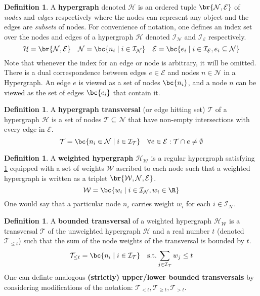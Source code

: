 \documentclass[aps, 10pt, english, twoside, pra, nofootinbib, longbibliography]{revtex4-1}
\theoremstyle{plain}
\theoremstyle{definition}
\newtheorem{definition}[theorem]{Definition}
\theoremstyle{remark}
\newcommand{\hgraph}{\mathcal{H}}
\newcommand{\nodes}{\mathcal{N}}
\newcommand{\weights}{\mathcal{W}}
\newcommand{\edges}{\mathcal{E}}
\newcommand{\trans}{\mathcal{T}}
\newcommand{\ind}{\mathcal{I}}
\newcommand{\term}[1]{\textcolor{Mahogany}{\textbf{#1}}}
\begin{document}
    \begin{definition}
        \label{def:hypergraph}
        A \term{hypergraph} denoted $\hgraph$ is an ordered tuple $\br{\nodes, \edges}$ of \textit{nodes} and \textit{edges} respectively where the nodes can represent any object and the edges are \textit{subsets} of nodes. For convenience of notation, one defines an index set over the nodes and edges of a hypergraph $\hgraph$ denoted $\ind_\nodes$ and $\ind_\edges$ respectively.
        \[ \hgraph = \br{\nodes, \edges} \quad \nodes = \bc{n_i \mid i \in \ind_\nodes} \quad \edges = \bc{e_i \mid i \in \ind_\edges, e_i \subseteq \nodes} \]
        Note that whenever the index for an edge or node is arbitrary, it will be omitted. There is a dual correspondence between edges $e \in \edges$ and nodes $n \in \nodes$ in a Hypergraph. An edge $e$ is viewed as a set of nodes $\bc{n_i}$, and a node $n$ can be viewed as the set of edges $\bc{e_i}$ that contain it.
    \end{definition}

    \begin{definition}
        A \term{hypergraph transversal} (or edge hitting set) $\trans$ of a hypergraph $\hgraph$ is a set of nodes $\trans \subseteq \nodes$ that have non-empty intersections with every edge in $\edges$.
        \[ \trans = \bc{n_i \in \nodes \mid i \in \ind_\trans } \quad \forall e \in \edges : \trans \cap e \neq \emptyset \]
    \end{definition}

    \begin{definition}
        A \term{weighted hypergraph} $\hgraph_\weights$ is a regular hypergraph satisfying \cref{def:hypergraph} equipped with a set of weights $\weights$ ascribed to each node such that a weighted hypergraph is written as a triplet $\br{\weights, \nodes, \edges}$.
        \[ \weights = \bc{w_i \mid i \in \ind_\nodes, w_i \in \R} \]
        One would say that a particular node $n_i$ carries weight $w_i$ for each $i \in \ind_\nodes$.
    \end{definition}

    \begin{definition}
        A \term{bounded transversal} of a weighted hypergraph $\hgraph_\weights$ is a transversal $\trans$ of the unweighted hypergraph $\hgraph$ and a real number $t$ (denoted $\trans_{\leq t}$) such that the sum of the node weights of the transversal is bounded by $t$.
        \[ \trans_{\leq t} = \bc{n_i \mid i \in \ind_\trans} \quad \text{s.t.} \sum_{j\in\ind_\trans} w_j \leq t \]
        One can definte analogous \term{(strictly) upper/lower bounded transversals} by considering modifications of the notation: $\trans_{< t}, \trans_{\geq t}, \trans_{> t}$.
    \end{definition}
\end{document}
